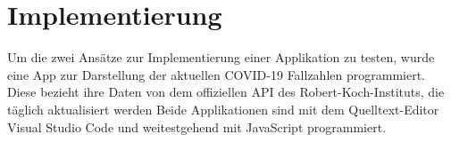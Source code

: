 \chapter{Implementierung}\label{ch:implementation}
Um die zwei Ansätze zur Implementierung einer Applikation zu testen, wurde eine App zur Darstellung der aktuellen COVID-19 Fallzahlen programmiert. Diese bezieht ihre Daten von dem offiziellen API des Robert-Koch-Instituts, die täglich aktualisiert werden %
Beide Applikationen sind mit dem Quelltext-Editor Visual Studio Code und weitestgehend mit JavaScript programmiert.



